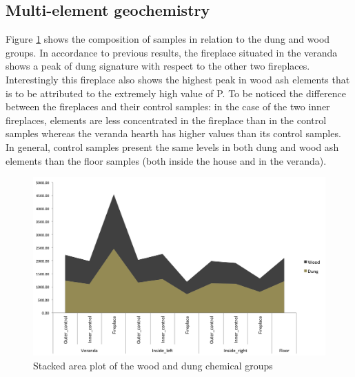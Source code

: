 \documentclass[authoryear,preprint,review,12pt]{elsarticle}
\begin{document}
\subsection{Multi-element geochemistry}
\label{subsec:3.2}
Figure \ref{fig:chem} shows the composition of samples in relation to the dung and wood groups. In accordance to previous results, the fireplace situated in the veranda shows a peak of dung signature with respect to the other two fireplaces. Interestingly this fireplace also shows the highest peak in wood ash elements that is to be attributed to the extremely high value of P. To be noticed the difference between the fireplaces and their control samples: in the case of the two inner fireplaces, elements are less concentrated in the fireplace than in the control samples whereas the veranda hearth has higher values than its control samples. In general, control samples present the same levels in both dung and wood ash elements than the floor samples (both inside the house and in the veranda).

\begin{figure}[ht!]
  \begin{center}
    \includegraphics[width=15cm]{figures/chem_bar}
    \caption{Stacked area plot of the wood and dung chemical groups}
    \label{fig:chem}
  \end{center}
\end{figure}
\end{document}
